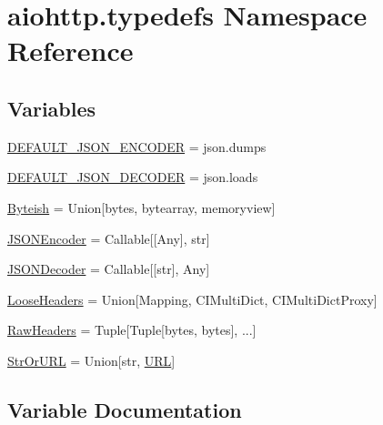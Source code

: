 \hypertarget{namespaceaiohttp_1_1typedefs}{}\section{aiohttp.\+typedefs Namespace Reference}
\label{namespaceaiohttp_1_1typedefs}
\subsection*{Variables}
\begin{DoxyCompactItemize}
\item 
\hyperlink{namespaceaiohttp_1_1typedefs_a05297260d83a9d6cd4c57658ad8f3922}{D\+E\+F\+A\+U\+L\+T\+\_\+\+J\+S\+O\+N\+\_\+\+E\+N\+C\+O\+D\+ER} = json.\+dumps
\item 
\hyperlink{namespaceaiohttp_1_1typedefs_a23429e1d7b0a0599b1bf1cb257a4218f}{D\+E\+F\+A\+U\+L\+T\+\_\+\+J\+S\+O\+N\+\_\+\+D\+E\+C\+O\+D\+ER} = json.\+loads
\item 
\hyperlink{namespaceaiohttp_1_1typedefs_ae7e6ab6f7b6801ef3bc61d28524fe3b7}{Byteish} = Union\mbox{[}bytes, bytearray, memoryview\mbox{]}
\item 
\hyperlink{namespaceaiohttp_1_1typedefs_ad53db8365df5527ee9f279f923582fc1}{J\+S\+O\+N\+Encoder} = Callable\mbox{[}\mbox{[}Any\mbox{]}, str\mbox{]}
\item 
\hyperlink{namespaceaiohttp_1_1typedefs_acdca271b3dce2d2d5e62a87763f51fa3}{J\+S\+O\+N\+Decoder} = Callable\mbox{[}\mbox{[}str\mbox{]}, Any\mbox{]}
\item 
\hyperlink{namespaceaiohttp_1_1typedefs_a664091e246989b23f5610d8f6cfcb42e}{Loose\+Headers} = Union\mbox{[}Mapping, C\+I\+Multi\+Dict, C\+I\+Multi\+Dict\+Proxy\mbox{]}
\item 
\hyperlink{namespaceaiohttp_1_1typedefs_a2b282d4f869e3b4c92e18bc670da9561}{Raw\+Headers} = Tuple\mbox{[}Tuple\mbox{[}bytes, bytes\mbox{]}, ...\mbox{]}
\item 
\hyperlink{namespaceaiohttp_1_1typedefs_ac271dfd8c697d5f5464f02ff18dc8e05}{Str\+Or\+U\+RL} = Union\mbox{[}str, \hyperlink{classyarl_1_1_u_r_l}{U\+RL}\mbox{]}
\end{DoxyCompactItemize}


\subsection{Variable Documentation}
\mbox{\label{namespaceaiohttp_1_1typedefs_ae7e6ab6f7b6801ef3bc61d28524fe3b7}} 
